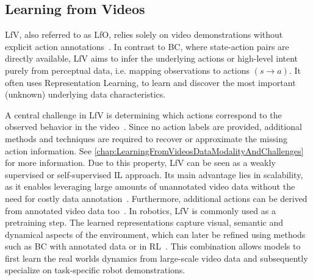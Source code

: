   
\subsection{Learning from Videos}
\label{sec:LearningfromVideos}
\ac{LfV}, also referred to as \ac{LfO}, relies solely on video demonstrations without explicit action annotations~\cite{McCarthy_2025, Burnwal2025LearningFO}. In contrast to \ac{BC}, where state-action pairs are directly available, \ac{LfV} aims to infer the underlying actions or high-level intent purely from perceptual data, i.e. mapping observations to actions $(s \rightarrow a)$. It often uses Representation Learning, to learn and discover the most important (unknown) underlying data characteristics.%

A central challenge in \ac{LfV} is determining which actions correspond to the observed behavior in the video~\cite{McCarthy_2025}. Since no action labels are provided, additional methods and techniques are required to recover or approximate the missing action information. See \autoref{chap:LearningFromVideosDataModalityAndChallenges} for more information.
Due to this property, \ac{LfV} can be seen as a weakly supervised or self-supervised \ac{IL} approach. 
Its main advantage lies in scalability, as it enables leveraging large amounts of unannotated video data without the need for costly data annotation~\cite{McCarthy_2025}. Furthermore, additional actions can be derived from annotated video data too~\cite{McCarthy_2025}.
In robotics, \ac{LfV} is commonly used as a pretraining step. The learned representations capture visual, semantic and dynamical aspects of the environment, which can later be refined using methods such as \ac{BC} with annotated data or in \ac{RL}~\cite{McCarthy_2025}. This combination allows models to first learn the real worlds dynamics from large-scale video data and subsequently specialize on task-specific robot demonstrations.


